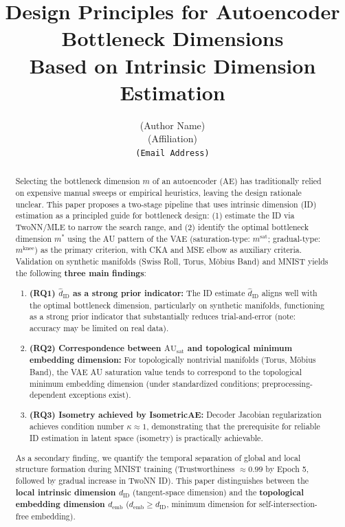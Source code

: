\documentclass[12pt,a4paper]{article}
\title{Design Principles for Autoencoder Bottleneck Dimensions\\
       Based on Intrinsic Dimension Estimation}
\author{(Author Name)\\
{\small (Affiliation)}\\
{\small \texttt{(Email Address)}}}
\date{}
\begin{document}
\maketitle

\begin{abstract}
Selecting the bottleneck dimension $m$ of an autoencoder (AE) has traditionally relied on expensive manual sweeps or empirical heuristics, leaving the design rationale unclear.
This paper proposes a two-stage pipeline that uses intrinsic dimension (ID) estimation as a principled guide for bottleneck design:
(1) estimate the ID via TwoNN/MLE to narrow the search range, and
(2) identify the optimal bottleneck dimension $m^*$ using the AU pattern of the VAE
(saturation-type: $m^{\mathrm{sat}}$; gradual-type: $m^{\mathrm{knee}}$) as the primary criterion,
with CKA and MSE elbow as auxiliary criteria.
Validation on synthetic manifolds (Swiss Roll, Torus, M\"{o}bius Band) and MNIST yields the following \textbf{three main findings}:
\begin{enumerate}
  \item \textbf{(RQ1) $\hat{d}_\mathrm{ID}$ as a strong prior indicator:}
        The ID estimate $\hat{d}_\mathrm{ID}$ aligns well with the optimal bottleneck dimension, particularly on synthetic manifolds, functioning as a strong prior indicator that substantially reduces trial-and-error
        (note: accuracy may be limited on real data).
  \item \textbf{(RQ2) Correspondence between $\mathrm{AU}_\mathrm{sat}$ and topological minimum embedding dimension:}
        For topologically nontrivial manifolds (Torus, M\"{o}bius Band), the VAE AU saturation value tends to correspond to the topological minimum embedding dimension
        (under standardized conditions; preprocessing-dependent exceptions exist).
  \item \textbf{(RQ3) Isometry achieved by IsometricAE:}
        Decoder Jacobian regularization achieves condition number $\kappa \approx 1$, demonstrating that the prerequisite for reliable ID estimation in latent space (isometry) is practically achievable.
\end{enumerate}
As a secondary finding, we quantify the temporal separation of global and local structure formation during MNIST training
(Trustworthiness $\approx 0.99$ by Epoch 5, followed by gradual increase in TwoNN ID).
This paper distinguishes between the \textbf{local intrinsic dimension $d_\mathrm{ID}$} (tangent-space dimension) and the \textbf{topological embedding dimension $d_\mathrm{emb}$} ($d_\mathrm{emb} \geq d_\mathrm{ID}$, minimum dimension for self-intersection-free embedding).
\end{abstract}
\end{document}

